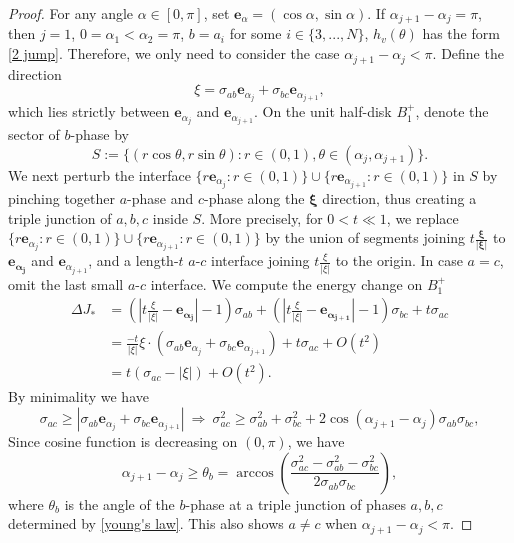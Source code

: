 \documentclass[leqno,11pt]{amsart}
\let\al=\alpha
\let\f=\frac
\theoremstyle{remark}
\begin{document}
\begin{proof}
For any angle $\al\in[0,\pi]$, set $\mathbf{e}_\al=(\cos\al,\sin\al)$. If $\al_{j+1}-\al_j=\pi$, then $j=1$, $0=\al_1<\al_2=\pi$, $b=a_i$ for some $i\in\{3,...,N\}$, $h_v(\theta)$ has the form \eqref{2 jump}. Therefore, we only need to consider the case $\al_{j+1}-\al_j<\pi$. Define the direction
\begin{equation*}
\xi=\sigma_{ab}\mathbf{e}_{\al_j}+\sigma_{bc}\mathbf{e}_{\al_{j+1}},
\end{equation*}
which lies strictly between $\mathbf{e}_{\al_j}$ and $\mathbf{e}_{\al_{j+1}}$. On the unit half-disk $B_1^+$, denote the sector of $b$-phase by
\[
S:=\{(r\cos\theta,r\sin\theta):r\in(0,1), \theta\in(\al_j,\al_{j+1})\}.
\]
We next perturb the interface $\{r\mathbf{e}_{\al_j}: r\in(0,1)\}\cup\{r\mathbf{e}_{\al_{j+1}}: r\in(0,1)\}$ in $S$ by pinching together $a$-phase and $c$-phase along the $\mathbf{\xi}$ direction, thus creating a triple junction of $a,b,c$ inside $S$. More precisely, for $0<t\ll 1$, we replace $\{r\mathbf{e}_{\al_j}: r\in(0,1)\}\cup\{r\mathbf{e}_{\al_{j+1}}: r\in(0,1)\}$ by the union of segments joining $t\f{\mathbf{\xi}}{|\mathbf{\xi}|}$ to $\mathbf{e_{\al_j}}$ and $\mathbf{e}_{\al_{j+1}}$, and a length-$t$ $a$-$c$ interface joining $t\f{\xi}{|\xi|}$ to the origin. In case $a=c$, omit the last small $a$-$c$ interface. We compute the energy change on $B_1^+$
\begin{align*}
    \Delta J_*&=\left(\left|t\f{\xi}{|\xi|}-\mathbf{e_{\alpha_j}}\right|-1 \right)\sigma_{ab}+ \left(\left|t\f{\xi}{|\xi|}-\mathbf{e_{\alpha_{j+1}}}\right|-1 \right)\sigma_{bc}+ t\sigma_{ac}\\
    &=\f{-t}{|\xi|} \xi\cdot(\sigma_{ab}\mathbf{e}_{\al_j}+\sigma_{bc}\mathbf{e}_{\al_{j+1}})+t\sigma_{ac}+O(t^2)\\
    &=t(\sigma_{ac}-|\xi|)+O(t^2).
\end{align*}
By minimality we have 
\begin{equation*}
    \sigma_{ac}\geq |\sigma_{ab}\mathbf{e}_{\al_j}+\sigma_{bc}\mathbf{e}_{\al_{j+1}}|\ \Rightarrow \ \sigma_{ac}^2\geq \sigma_{ab}^2+\sigma_{bc}^2 +2\cos(\al_{j+1}-\al_{j})\sigma_{ab}\sigma_{bc},
\end{equation*}
Since cosine function is decreasing on $(0,\pi)$, we have 
\begin{equation}\label{est: one sector angle}
    \al_{j+1}-\al_j\geq \theta_b= \arccos\left(\f{\sigma_{ac}^2-\sigma_{ab}^2-\sigma_{bc}^2}{2\sigma_{ab}\sigma_{bc}}\right),
\end{equation}
where $\theta_b$ is the angle of the $b$-phase at a triple junction of phases $a,b,c$ determined by \eqref{young's law}. This also shows $a\neq c$ when $\al_{j+1}-\al_j<\pi$.


\end{proof}
\end{document}
